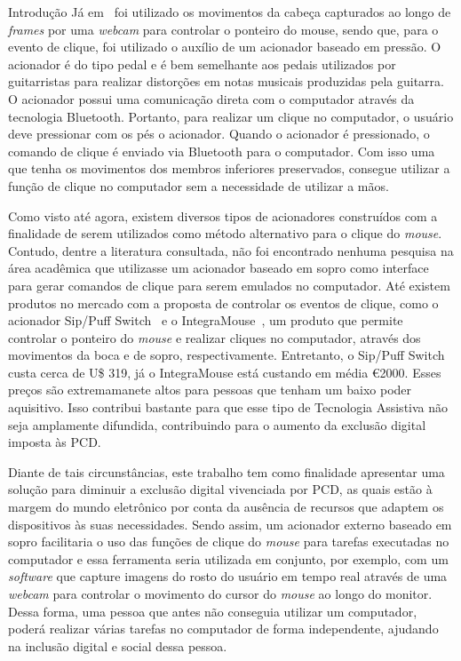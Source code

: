 \begin{chapter}{Introdução}
Já em~\cite{Antunes16} foi utilizado os movimentos da cabeça capturados ao longo
de \textit{frames} por uma \textit{webcam} para controlar o ponteiro do mouse,
sendo que, para o evento de clique, foi utilizado o auxílio de um acionador
baseado em pressão. O acionador é do tipo pedal e é bem semelhante aos pedais
utilizados por guitarristas para realizar distorções em notas musicais
produzidas pela guitarra. O acionador possui uma comunicação direta com o
computador através da tecnologia Bluetooth. Portanto, para realizar um clique no
computador, o usuário deve pressionar com os pés o acionador. Quando o acionador
é pressionado, o comando de clique é enviado via Bluetooth para o computador.
Com isso uma que tenha os movimentos dos membros inferiores preservados,
consegue utilizar a função de clique no computador sem a necessidade de utilizar
a mãos. 

Como visto até agora, existem diversos tipos de acionadores construídos com a
finalidade de serem utilizados como método alternativo para o clique do
\textit{mouse}.  Contudo, dentre a literatura consultada, não foi encontrado
nenhuma pesquisa na área acadêmica que utilizasse um acionador baseado em sopro
como interface para gerar comandos de clique para serem emulados no computador.
Até existem produtos no mercado com a proposta de controlar os eventos de
clique, como o acionador Sip/Puff Switch~\cite{SipPuff} e o
IntegraMouse~\cite{IntegraMouse}, um produto que permite controlar o ponteiro do
\textit{mouse} e realizar cliques no computador, através dos movimentos da boca
e de sopro, respectivamente. Entretanto, o Sip/Puff Switch custa cerca
de U\$ 319, já o IntegraMouse está custando em média \euro 2000. Esses preços
são extremamanete altos para pessoas que tenham um baixo poder aquisitivo. Isso
contribui bastante para que esse tipo de Tecnologia Assistiva não seja
amplamente difundida, contribuindo para o aumento da exclusão digital imposta às
PCD.

Diante de tais circunstâncias, este trabalho tem como finalidade apresentar  uma
solução para diminuir a exclusão digital vivenciada por PCD, as quais estão à
margem do mundo eletrônico por conta da ausência de recursos que adaptem os
dispositivos às suas necessidades. Sendo assim, um acionador externo baseado em
sopro facilitaria o uso das funções de clique do \textit{mouse} para tarefas
executadas no computador e essa ferramenta seria utilizada em conjunto, por
exemplo, com um \textit{software} que capture imagens do rosto do usuário em
tempo real através de uma \textit{webcam} para controlar o movimento do cursor
do \textit{mouse} ao longo do monitor. Dessa forma, uma pessoa que antes não
conseguia utilizar um computador, poderá realizar várias tarefas no computador
de forma independente, ajudando na inclusão digital e social dessa pessoa.


\end{chapter}
